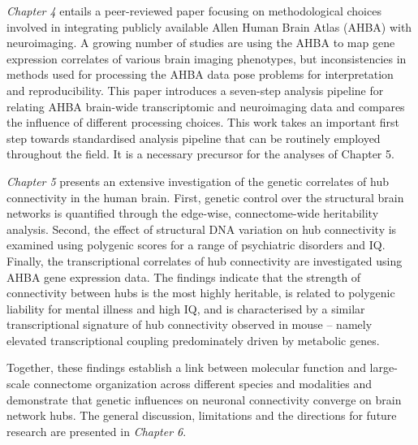 \textit{Chapter 4} entails a peer-reviewed paper focusing on methodological choices involved in integrating publicly available Allen Human Brain Atlas (AHBA) with neuroimaging. A growing number of studies are using the AHBA to map gene expression correlates of various brain imaging phenotypes, but inconsistencies in methods used for processing the AHBA data pose problems for interpretation and reproducibility. This paper introduces a seven-step analysis pipeline for relating AHBA brain-wide transcriptomic and neuroimaging data and compares the influence of different processing choices. This work takes an important first step towards standardised analysis pipeline that can be routinely employed throughout the field. It is a necessary precursor for the analyses of Chapter 5.

\textit{Chapter 5} presents an extensive investigation of the genetic correlates of hub connectivity in the human brain. First, genetic control over the structural brain networks is quantified through the edge-wise, connectome-wide heritability analysis. Second, the effect of structural DNA variation on hub connectivity is examined using polygenic scores for a range of psychiatric disorders and IQ. Finally, the transcriptional correlates of hub connectivity are investigated using AHBA gene expression data. The findings indicate that the strength of connectivity between hubs is the most highly heritable, is related to polygenic liability for mental illness and high IQ, and is characterised by a similar transcriptional signature of hub connectivity observed in mouse -- namely elevated transcriptional coupling predominately driven by metabolic genes. 

Together, these findings establish a link between molecular function and large-scale connectome organization across different species and modalities and demonstrate that genetic influences on neuronal connectivity converge on brain network hubs. The general discussion, limitations and the directions for future research are presented in \textit{Chapter 6}.
